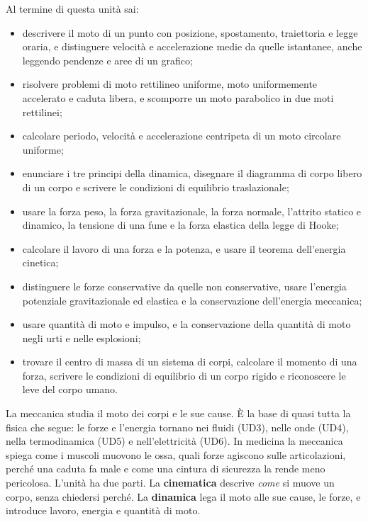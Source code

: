 \dispensa

\begin{tcolorbox}[fisbox={formula}{formulaBg},title={Obiettivi dell'unità}]
Al termine di questa unità sai:
\begin{itemize}
  \item descrivere il moto di un punto con posizione, spostamento, traiettoria e legge oraria, e distinguere velocità e accelerazione medie da quelle istantanee, anche leggendo pendenze e aree di un grafico;
  \item risolvere problemi di moto rettilineo uniforme, moto uniformemente accelerato e caduta libera, e scomporre un moto parabolico in due moti rettilinei;
  \item calcolare periodo, velocità e accelerazione centripeta di un moto circolare uniforme;
  \item enunciare i tre principi della dinamica, disegnare il diagramma di corpo libero di un corpo e scrivere le condizioni di equilibrio traslazionale;
  \item usare la forza peso, la forza gravitazionale, la forza normale, l'attrito statico e dinamico, la tensione di una fune e la forza elastica della legge di Hooke;
  \item calcolare il lavoro di una forza e la potenza, e usare il teorema dell'energia cinetica;
  \item distinguere le forze conservative da quelle non conservative, usare l'energia potenziale gravitazionale ed elastica e la conservazione dell'energia meccanica;
  \item usare quantità di moto e impulso, e la conservazione della quantità di moto negli urti e nelle esplosioni;
  \item trovare il centro di massa di un sistema di corpi, calcolare il momento di una forza, scrivere le condizioni di equilibrio di un corpo rigido e riconoscere le leve del corpo umano.
\end{itemize}
\end{tcolorbox}

La meccanica studia il moto dei corpi e le sue cause. È la base di quasi tutta la fisica che segue: le forze e l'energia tornano nei fluidi (UD3), nelle onde (UD4), nella termodinamica (UD5) e nell'elettricità (UD6). In medicina la meccanica spiega come i muscoli muovono le ossa, quali forze agiscono sulle articolazioni, perché una caduta fa male e come una cintura di sicurezza la rende meno pericolosa. L'unità ha due parti. La \textbf{cinematica} descrive \emph{come} si muove un corpo, senza chiedersi perché. La \textbf{dinamica} lega il moto alle sue cause, le forze, e introduce lavoro, energia e quantità di moto.

